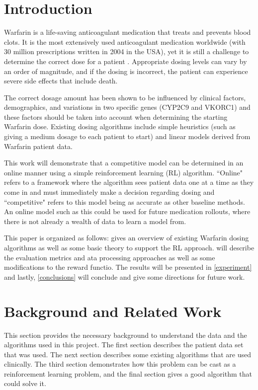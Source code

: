 \documentclass{article}
\begin{document}
\section{Introduction}
\label{introduction}

Warfarin is a life-saving anticoagulant medication that treats and prevents blood clots. It is the most extensively used anticoagulant medication worldwide (with 30 million prescriptions written in 2004 in the USA), yet it is still a challenge to determine the correct dose for a patient \cite{international2009estimation}. Appropriate dosing levels can vary by an order of magnitude, and if the dosing is incorrect, the patient can experience severe side effects that include death. 

The correct dosage amount has been shown to be influenced by clinical factors, demographics, and variations in two specific genes (CYP2C9 and VKORC1) \cite{international2009estimation} and these factors should be taken into account when determining the starting Warfarin dose. Existing dosing algorithms include simple heuristics (such as giving a medium dosage to each patient to start) and linear models derived from Warfarin patient data. 

This work will demonstrate that a competitive model can be determined in an online manner using a simple reinforcement learning (RL) algorithm. ``Online" refers to a framework where the algorithm sees patient data one at a time as they come in and must immediately make a decision regarding dosing and ``competitive" refers to this model being as accurate as other baseline methods. An online model such as this could be used for future medication rollouts, where there is not already a wealth of data to learn a model from.

This paper is organized as follows:  gives an overview of existing Warfarin dosing algorithms as well as some basic theory to support the RL approach.  will describe the evaluation metrics and ata processing approaches as well as some modifications to the reward functio. The results will be presented in \cref{experiment} and lastly, \cref{conclusions} will conclude and give some directions for future work.

\section{Background and Related Work}
\label{background}
This section provides the necessary background to understand the data and the algorithms used in this project. The first section describes the patient data set that was used. The next section describes some existing algorithms that are used clinically. The third section demonstrates how this problem can be cast as a reinforcement learning problem, and the final section gives a good algorithm that could solve it.
\end{document}
